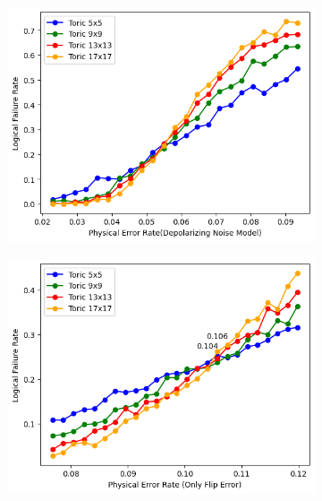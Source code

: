 \documentclass[
	a4paper, %
	10pt, %
	unnumberedsections, %
	twoside, %
]{LTJournalArticle}
\begin{document}
\begin{figure}[htbp] %
    \centering %
    \vspace{0cm} %
    \setlength{\abovecaptionskip}{0.cm} %
    \setlength{\belowcaptionskip}{0.cm} %
    \setlength{\belowdisplayskip}{3pt} %
	\begin{subfigure}[b]{0.9\linewidth}
        \includegraphics[width=\linewidth]{img/errorThres.png}
        \caption{}
        \label{fig:errorrate1}
    \end{subfigure}
    \hfill
    \begin{subfigure}[b]{0.9\linewidth}
        \includegraphics[width=\linewidth]{img/errorThres2.png}
        \caption{}
        \label{fig:errorate2}
    \end{subfigure}
    \caption{}
    \end{figure}
\end{document}
